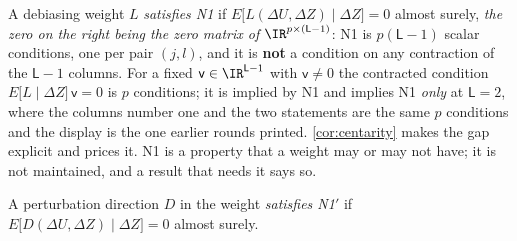 %
%

\begin{assumption}\label{ass:centering}
A debiasing weight $L$ \emph{satisfies N1} if
$E\big[L(\Delta U,\Delta Z)\mid\Delta Z\big]=0$ almost surely, \emph{the zero on the right being the
zero matrix of $\IR^{p\times(\mathsf L-1)}$}: N1 is $p(\mathsf L-1)$ scalar conditions, one per pair
$(j,l)$, and it is \textbf{not} a condition on any contraction of the $\mathsf L-1$ columns. For a
fixed $\mathsf v\in\IR^{\mathsf L-1}$ with $\mathsf v\ne0$ the contracted condition
$E\big[L\mid\Delta Z\big]\,\mathsf v=0$ is $p$ conditions; it is implied by N1 and implies N1
\emph{only} at $\mathsf L=2$, where the columns number one and the two statements are the same $p$
conditions and the display is the one earlier rounds printed. \cref{cor:centarity} makes the gap
explicit and prices it. N1 is a property that a weight may
or may not have; it is not maintained, and a result that needs it says so.
\end{assumption}

\begin{assumption}\label{ass:centeringdir}
A perturbation direction $D$ in the weight \emph{satisfies N1$'$} if
$E\big[D(\Delta U,\Delta Z)\mid\Delta Z\big]=0$ almost surely.
\end{assumption}

